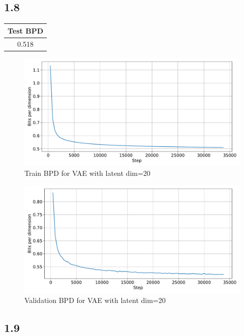 \documentclass{article}
\begin{document}
\subsection*{1.8}

\begin{table}[H]
    \centering
    \begin{tabular}{|c|}
    \hline
    \textbf{Test BPD} \\
    \hline
    0.518 \\
    \hline
    \end{tabular}
\end{table}

\begin{figure}[H]
    \centering
    \includegraphics[width=\textwidth]{images/train_bpd.pdf}
    \caption{Train BPD for VAE with latent dim=20}
    \label{fig:train_bpd}
\end{figure}
\begin{figure}
    \centering
    \includegraphics[width=\textwidth]{images/val_bpd.pdf}
    \caption{Validation BPD for VAE with latent dim=20}
    \label{fig:val_bpd}
\end{figure}

\subsection*{1.9}
\end{document}
